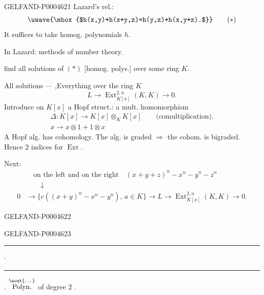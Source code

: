 \begin{GelfandAdjacentEvidence}{GELFAND-P000462}{1}
Lazard’s rel.:
\[
\uwave{\mbox{$h(x,y)+h(x+y,z)=h(y,z)+h(x,y+z).$}}\qquad(*)
\]
It suffices to take homog. polynomials $h$.

In Lazard: methods of number theory.

\quad find all solutions of $(*)$ [homog. polys.] over some ring $K$.

All solutions — ,\quad Everything over the ring $K$
\[
L\longrightarrow\operatorname{Ext}_{K[x]}^{2,n}(K,K)\longrightarrow0.
\]
Introduce on $K[x]$ a Hopf struct.: a mult. homomorphism
\[
\begin{gathered}
\Delta:K[x]\longrightarrow K[x]\otimes_K K[x]\qquad\text{(comultiplication).}\\
x\longrightarrow x\otimes1+1\otimes x
\end{gathered}
\]
A Hopf alg. has cohomology. The alg. is graded $\Rightarrow$ the cohom. is bigraded.
Hence $2$ indices for $\operatorname{Ext}$.

Next:
\[
\begin{aligned}
 &\quad\text{on the left and on the right}\quad (x+y+z)^n-x^n-y^n-z^n\\[-.2ex]
 &\qquad\downarrow\\[-.2ex]
 0&\longrightarrow
 \{c((x+y)^n-x^n-y^n),\,a\in K\}
 \longrightarrow L\longrightarrow
 \operatorname{Ext}_{K[x]}^{2,n}(K,K)\longrightarrow0.
\end{aligned}
\]
\end{GelfandAdjacentEvidence}
\begin{GelfandAdjacentEvidence}{GELFAND-P000462}{2}

\end{GelfandAdjacentEvidence}
\begin{GelfandAdjacentEvidence}{GELFAND-P000462}{3}


\begin{center}
\rule[.5ex]{17mm}{.35pt}\enspace$\cdot$\enspace\rule[.5ex]{22mm}{.35pt}
\end{center}

.\quad
$\overset{\text{\sout{\ldots}}}{\text{Polyn.}}$ of degree $2$
.
\end{GelfandAdjacentEvidence}
